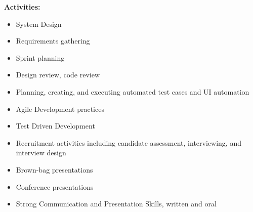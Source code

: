 \documentclass[9pt]{developercv} %
\begin{document}
\begin{minipage}[t]{1\textwidth}
    \begin{minipage}[t]{0.12\textwidth}
        \textbf{Activities:}
    \end{minipage}
    \hfill
        \begin{itemize}[noitemsep,topsep=0pt,parsep=0pt,partopsep=0pt, leftmargin=100pt]
            \item System Design
            \item Requirements gathering
            \item Sprint planning
            \item Design review, code review
            \item Planning, creating, and executing automated test cases and UI automation
            \item Agile Development practices
            \item Test Driven Development
            \item Recruitment activities including candidate assessment, interviewing, and interview design
            \item Brown-bag presentations
            \item Conference presentations
            \item Strong Communication and Presentation Skills, written and oral
    \end{itemize}
    \vspace{4mm}

\end{minipage}
\hfill %
\end{document}
